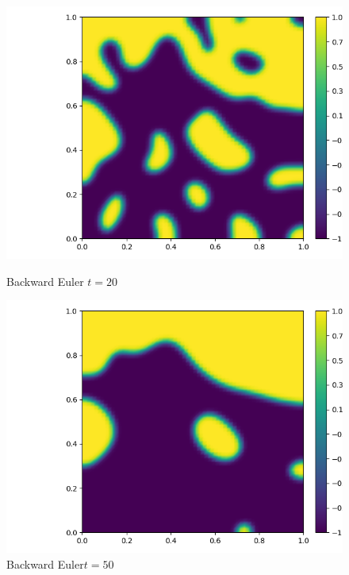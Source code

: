 \documentclass{article}
\begin{document}
\begin{figure}[H]
    \centering
    \begin{minipage}{0.5\textwidth}
       \centering
	  \includegraphics[width=\linewidth]{FEPics/Allen Cahn Test2_60x60_0.025_BE_EndTime=20.png}
	  \caption{Backward Euler $t=20$}
    \end{minipage}\hfill
    \begin{minipage}{0.5\textwidth}
       \centering
	  \includegraphics[width=\linewidth]{FEPics/Allen Cahn Test2_60x60_0.025_BE_EndTime=50.png}
	  \caption{Backward Euler$t=50$}
    \end{minipage}
\end{figure}
\end{document}
